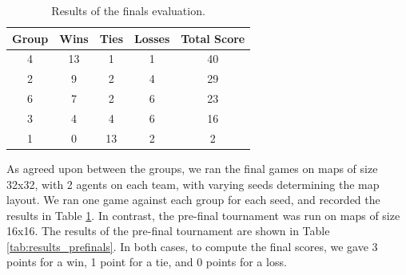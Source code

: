 \documentclass[a4paper,12pt]{article}
\begin{document}
\begin{table}[!hptb]
  \centering
  \begin{tabular}{|c|c|c|c|c|}
    \hline
    \textbf{Group} & \textbf{Wins} & \textbf{Ties} & \textbf{Losses} & \textbf{Total Score} \\
    \hline
    4 & 13 & 1 & 1 & 40 \\
    \hline
    2 & 9 & 2 & 4 & 29 \\
    \hline
    6 & 7 & 2 & 6 & 23 \\
    \hline
    3 & 4 & 4 & 6 & 16 \\
    \hline
    1 & 0 & 13 & 2 & 2 \\
    \hline
  \end{tabular}
  \caption{Results of the finals evaluation.}
  \label{tab:results_finals}
\end{table}






As agreed upon between the groups, we ran the final games on maps  of size 32x32, with 2 agents on each team, with varying seeds determining the map layout. We ran one game against each group for each seed, and recorded the results in Table \ref{tab:results_finals}. In contrast, the pre-final tournament was run on maps of size 16x16. The results of the pre-final tournament are shown in Table \ref{tab:results_prefinals}. In both cases, to compute the final scores, we gave 3 points for a win, 1 point for a tie, and 0 points for a loss.



\end{document}
